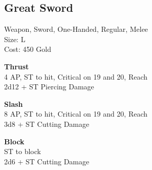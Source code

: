 \subsection{Great Sword}\label{weapon:greatSword}
Weapon, Sword, One-Handed, Regular, Melee\\
Size: L\\
Cost: 450 Gold

\textbf{Thrust}\\
4 AP, ST to hit, Critical on 19 and 20,  Reach\\
2d12 + \texttimes ST Piercing Damage

\textbf{Slash}\\
8 AP, ST to hit, Critical on 19 and 20,  Reach\\
3d8 + \texttimes ST Cutting Damage

\textbf{Block}\\
ST to block\\
2d6 + \texttimes ST Cutting Damage